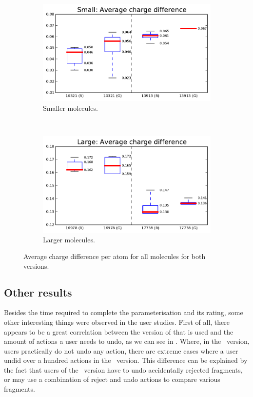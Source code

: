 \begin{figure}[h!]
\centering
\begin{subfigure}[t]{0.48\textwidth}
\centering
\includegraphics[width=\textwidth]{img/graphs/1c_01.pdf}
\caption{Smaller molecules.}
\end{subfigure}%
~
\begin{subfigure}[t]{0.48\textwidth}
\centering
\includegraphics[width=\textwidth]{img/graphs/1d_01.pdf}
\caption{Larger molecules.}
\end{subfigure}
\caption{Average charge difference per atom for all molecules for both versions.}
\end{figure}


\subsection{Other results}

Besides the time required to complete the parameterisation and its rating, some other interesting things were observed in the user studies. First of all, there appears to be a great correlation between the version of \oframp{} that is used and the amount of actions a user needs to undo, as we can see in . Where, in the \IDa\ version, users practically do not undo any action, there are extreme cases where a user undid over a hundred actions in the \IDb\ version. This difference can be explained by the fact that users of the \IDb\ version have to undo accidentally rejected fragments, or may use a combination of reject and undo actions to compare various fragments.

